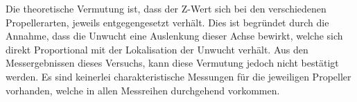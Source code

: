 \begin{table}[H]
\centering
{}
\caption{Messergebnisse mit Unwucht auf Seite ohne Markierung}
\label{tab:imbalance_other_side}
\end{table}

Die theoretische Vermutung ist, dass der Z-Wert sich bei den verschiedenen Propellerarten, jeweils entgegengesetzt verhält.
Dies ist begründet durch die Annahme, dass die Unwucht eine Auslenkung dieser Achse bewirkt, welche sich direkt Proportional mit der Lokalisation der Unwucht verhält.
Aus den Messergebnissen dieses Versuchs, kann diese Vermutung jedoch nicht bestätigt werden.
Es sind keinerlei charakteristische Messungen für die jeweiligen Propeller vorhanden, welche in allen Messreihen durchgehend vorkommen.

